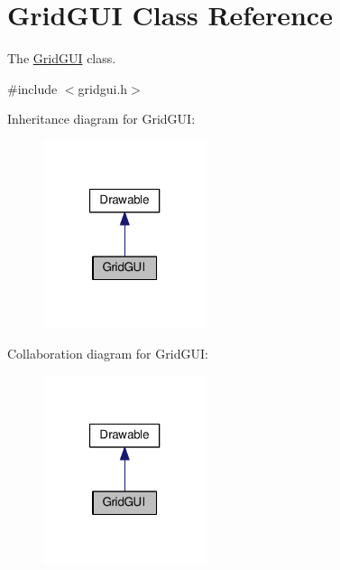 \hypertarget{classGridGUI}{\section{Grid\-G\-U\-I Class Reference}
\label{classGridGUI}
}


The \hyperlink{classGridGUI}{Grid\-G\-U\-I} class.  




{\ttfamily \#include $<$gridgui.\-h$>$}



Inheritance diagram for Grid\-G\-U\-I\-:
\nopagebreak
\begin{figure}[H]
\begin{center}
\leavevmode
\includegraphics[width=136pt]{classGridGUI__inherit__graph}
\end{center}
\end{figure}


Collaboration diagram for Grid\-G\-U\-I\-:
\nopagebreak
\begin{figure}[H]
\begin{center}
\leavevmode
\includegraphics[width=136pt]{classGridGUI__coll__graph}
\end{center}
\end{figure}
